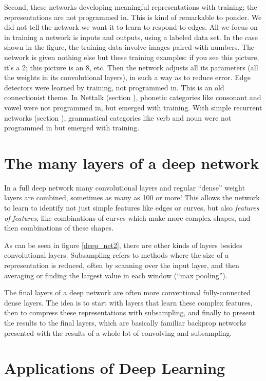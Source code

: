 Second, these networks developing meaningful representations with training; the representations are not programmed in. This is kind of remarkable to ponder. We did not tell the network we want it to learn to respond to edges. All we focus on in training a network is inputs and outputs, using a labeled data set.  In the case shown in the figure, the training data involve images paired with numbers. The network is given nothing else but these training examples: if you see this picture, it's a 2; this picture is an 8, etc. Then the network adjusts all its parameters (all the weights in its convolutional layers), in such a way as to reduce error.  Edge detectors were learned by training, not programmed in. This is an old connectionist theme. In Nettalk (section ), phonetic categories like consonant and vowel were not programmed in, but emerged with training. With simple recurrent networks  (section ), grammatical categories like verb and noun were not programmed in but  emerged with training.

\section{The many layers of a deep network}

In a full deep network many convolutional layers and regular ``dense'' weight layers are combined, sometimes as many as 100 or more! This allows the network to learn to identify not just simple features like edges or curves, but also \emph{features of features}, like combinations of curves which make more complex shapes, and then combinations of these shapes. 

As can be seen in figure \ref{deep_net2}, there are other kinds of layers besides convolutional layers. Subsampling refers to methods where the size of a representation is reduced, often by scanning over the input layer, and then averaging or finding the largest value in each window (``max pooling''). 

The final layers of a deep network are often more conventional fully-connected dense layers. The idea is to start with layers that learn these complex features, then to compress these representations with subsampling, and finally to present the results to the final layers, which are basically familiar backprop networks presented with the results of a whole lot of convolving and subsampling.

\section{Applications of Deep Learning}

